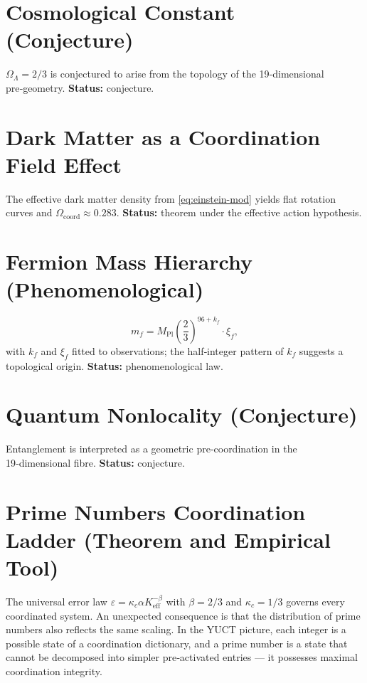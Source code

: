\documentclass[12pt,a4paper]{article}
\newcommand{\coord}{\mathrm{coord}}
\begin{document}
	\section{Cosmological Constant (Conjecture)}
	\label{sec:Lambda}
	\(\Omega_\Lambda = 2/3\) is conjectured to arise from the topology of the 19‑dimensional pre‑geometry. \textbf{Status:} conjecture.
	
	\section{Dark Matter as a Coordination Field Effect}
	\label{sec:DM}
	The effective dark matter density from \eqref{eq:einstein-mod} yields flat rotation curves and \(\Omega_{\coord} \approx 0.283\). \textbf{Status:} theorem under the effective action hypothesis.
	
	\section{Fermion Mass Hierarchy (Phenomenological)}
	\label{sec:masses}
	\[
	m_f = M_{\mathrm{Pl}} \left(\frac{2}{3}\right)^{96 + k_f} \cdot \xi_f,
	\]
	with \(k_f\) and \(\xi_f\) fitted to observations; the half‑integer pattern of \(k_f\) suggests a topological origin. \textbf{Status:} phenomenological law.
	
	\section{Quantum Nonlocality (Conjecture)}
	\label{sec:nonlocality}
	Entanglement is interpreted as a geometric pre‑coordination in the 19‑dimensional fibre. \textbf{Status:} conjecture.
	
	\section{Prime Numbers Coordination Ladder (Theorem and Empirical Tool)}
	\label{sec:primes}
	
	The universal error law \(\varepsilon = \kappa_c\alpha K_{\mathrm{eff}}^{-\beta}\) with \(\beta=2/3\) and \(\kappa_c=1/3\) governs every coordinated system.  An unexpected consequence is that the distribution of prime numbers also reflects the same scaling.  In the YUCT picture, each integer is a possible state of a coordination dictionary, and a prime number is a state that cannot be decomposed into simpler pre‑activated entries — it possesses maximal coordination integrity.
	
\end{document}

